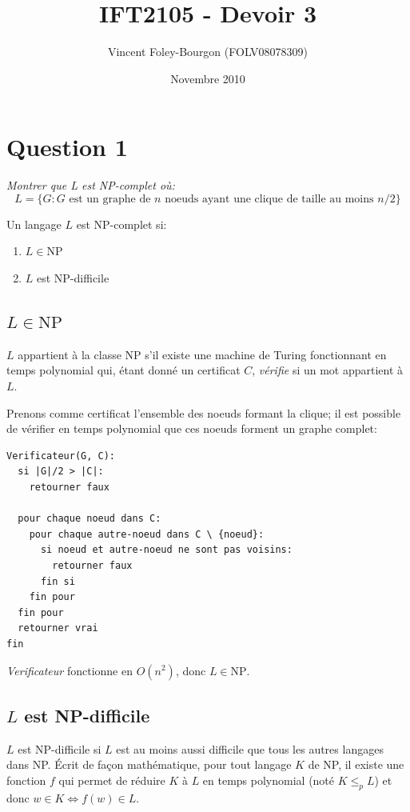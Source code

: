 \documentclass[10pt]{article}
\newcommand{\NP}{\text{NP}}
\begin{document}
\title{IFT2105 - Devoir 3}
\date{Novembre 2010}
\author{Vincent Foley-Bourgon (FOLV08078309)}
\maketitle

\section{Question 1}

\emph{Montrer que L est NP-complet où:}
\[
L = \{ G : G \text{ est un graphe de $n$ noeuds ayant une clique de
  taille au moins $n/2$} \}
\]

Un langage $L$ est NP-complet si:
\begin{enumerate}
  \item $L \in \NP$
  \item $L$ est NP-difficile
\end{enumerate}

\subsection{$L \in \NP$}

$L$ appartient à la classe NP s'il existe une machine de Turing
fonctionnant en temps polynomial qui, étant donné un certificat $C$,
\emph{vérifie} si un mot appartient à $L$.

Prenons comme certificat l'ensemble des noeuds formant la clique; il
est possible de vérifier en temps polynomial que ces noeuds forment un
graphe complet:

\begin{verbatim}
Verificateur(G, C):
  si |G|/2 > |C|:
    retourner faux

  pour chaque noeud dans C:
    pour chaque autre-noeud dans C \ {noeud}:
      si noeud et autre-noeud ne sont pas voisins:
        retourner faux
      fin si
    fin pour
  fin pour
  retourner vrai
fin
\end{verbatim}

\emph{Verificateur} fonctionne en $O(n^2)$, donc $L \in \NP$.

\subsection{$L$ est NP-difficile}

$L$ est NP-difficile si $L$ est au moins aussi difficile que tous les
autres langages dans NP.  Écrit de façon mathématique, pour tout
langage $K$ de NP, il existe une fonction $f$ qui permet de réduire
$K$ à $L$ en temps polynomial (noté $K \le_p L$) et donc $w \in K \iff
f(w) \in L$.
\end{document}
